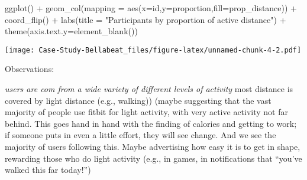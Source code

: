 \documentclass[
]{article}
\newenvironment{Shaded}{\begin{snugshade}}{\end{snugshade}}
\newcommand{\AttributeTok}[1]{\textcolor[rgb]{0.77,0.63,0.00}{#1}}
\newcommand{\FunctionTok}[1]{\textcolor[rgb]{0.00,0.00,0.00}{#1}}
\newcommand{\NormalTok}[1]{#1}
\newcommand{\SpecialCharTok}[1]{\textcolor[rgb]{0.00,0.00,0.00}{#1}}
\newcommand{\StringTok}[1]{\textcolor[rgb]{0.31,0.60,0.02}{#1}}
\begin{document}
\begin{Shaded}
\begin{Highlighting}[]
  \FunctionTok{ggplot}\NormalTok{() }\SpecialCharTok{+}
  \FunctionTok{geom\_col}\NormalTok{(}\AttributeTok{mapping =} \FunctionTok{aes}\NormalTok{(}\AttributeTok{x=}\NormalTok{id,}\AttributeTok{y=}\NormalTok{proportion,}\AttributeTok{fill=}\NormalTok{prop\_distance)) }\SpecialCharTok{+}
  \FunctionTok{coord\_flip}\NormalTok{() }\SpecialCharTok{+} 
  \FunctionTok{labs}\NormalTok{(}\AttributeTok{title =} \StringTok{"Participants by proportion of active distance"}\NormalTok{) }\SpecialCharTok{+}
  \FunctionTok{theme}\NormalTok{(}\AttributeTok{axis.text.y=}\FunctionTok{element\_blank}\NormalTok{())}
\end{Highlighting}
\end{Shaded}

\texttt{[image: Case-Study-Bellabeat\_files/figure-latex/unnamed-chunk-4-2.pdf]}

Observations:

\emph{users are com from a wide variety of different levels of activity
}most distance is covered by light distance (e.g., walking)) (maybe
suggesting that the vast majority of people use fitbit for light
activity, with very active activity not far behind. This goes hand in
hand with the finding of calories and getting to work; if someone puts
in even a little effort, they will see change. And we see the majority
of users following this. Maybe advertising how easy it is to get in
shape, rewarding those who do light activity (e.g., in games, in
notifications that ``you've walked this far today!'')
\end{document}
